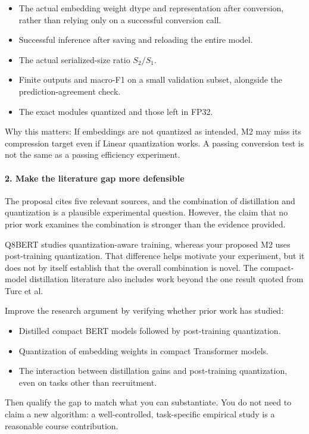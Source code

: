 \begin{itemize}
\item The actual embedding weight dtype and representation after conversion, rather than relying only on a successful conversion call.
\item Successful inference after saving and reloading the entire model.
\item The actual serialized-size ratio $S_2/S_1$.
\item Finite outputs and macro-F1 on a small validation subset, alongside the prediction-agreement check.
\item The exact modules quantized and those left in FP32.
\end{itemize}
Why this matters: If embeddings are not quantized as intended, M2 may miss its compression target even if Linear quantization works. A passing conversion test is not the same as a passing efficiency experiment.

\paragraph*{2. Make the literature gap more defensible}
The proposal cites five relevant sources, and the combination of distillation and quantization is a plausible experimental question. However, the claim that no prior work examines the combination is stronger than the evidence provided.

Q8BERT studies quantization-aware training, whereas your proposed M2 uses post-training quantization. That difference helps motivate your experiment, but it does not by itself establish that the overall combination is novel. The compact-model distillation literature also includes work beyond the one result quoted from Turc et al.

Improve the research argument by verifying whether prior work has studied:

\begin{itemize}
\item Distilled compact BERT models followed by post-training quantization.
\item Quantization of embedding weights in compact Transformer models.
\item The interaction between distillation gains and post-training quantization, even on tasks other than recruitment.
\end{itemize}
Then qualify the gap to match what you can substantiate. You do not need to claim a new algorithm: a well-controlled, task-specific empirical study is a reasonable course contribution.

